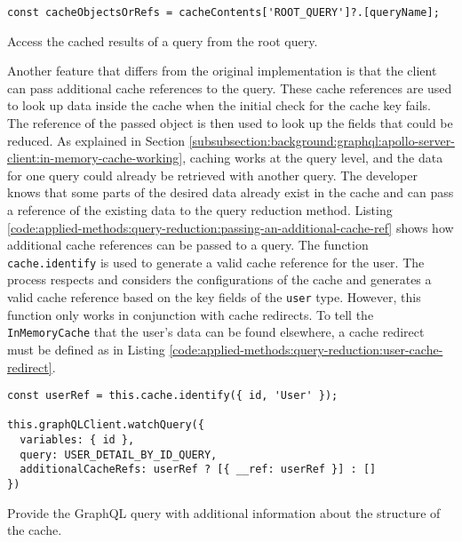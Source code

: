\ifshowListings
\begin{listing}[H]
\begin{verbatim}
const cacheObjectsOrRefs = cacheContents['ROOT_QUERY']?.[queryName];
\end{verbatim}
\caption{Access the cached results of a query from the root query.}\label{code:applied-methods:query-reduction:getting-cache-content}
\end{listing}
\fi

\noindent Another feature that differs from the original implementation is that the client can pass additional cache references to the query. These cache references are used to look up data inside the cache when the initial check for the cache key fails. The reference of the passed object is then used to look up the fields that could be reduced. As explained in Section \ref{subsubsection:background:graphql:apollo-server-client:in-memory-cache-working}, caching works at the query level, and the data for one query could already be retrieved with another query. The developer knows that some parts of the desired data already exist in the cache and can pass a reference of the existing data to the query reduction method. Listing \ref{code:applied-methods:query-reduction:passing-an-additional-cache-ref} shows how additional cache references can be passed to a query. The function \texttt{cache.identify} is used to generate a valid cache reference for the user. The process respects and considers the configurations of the cache and generates a valid cache reference based on the key fields of the \texttt{user} type. However, this function only works in conjunction with cache redirects. To tell the \texttt{InMemoryCache} that the user's data can be found elsewhere, a cache redirect must be defined as in Listing \ref{code:applied-methods:query-reduction:user-cache-redirect}.

\ifshowListings
\begin{listing}[H]
\begin{verbatim}
const userRef = this.cache.identify({ id, 'User' });

this.graphQLClient.watchQuery({
  variables: { id },
  query: USER_DETAIL_BY_ID_QUERY,
  additionalCacheRefs: userRef ? [{ __ref: userRef }] : []
})
\end{verbatim}
\caption{Provide the GraphQL query with additional information about the structure of the cache.}\label{code:applied-methods:query-reduction:passing-an-additional-cache-ref}
\end{listing}
\fi

